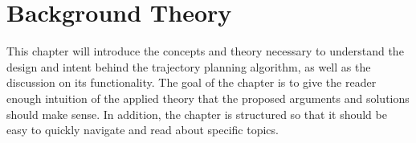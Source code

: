 \blankpage
\section{Background Theory}
This chapter will introduce the concepts and theory necessary to understand the design and intent behind the trajectory planning algorithm, as well as the discussion on its functionality.
The goal of the chapter is to give the reader enough intuition of the applied theory that the proposed arguments and solutions should make sense. In addition, the chapter is structured
so that it should be easy to quickly navigate and read about specific topics.


